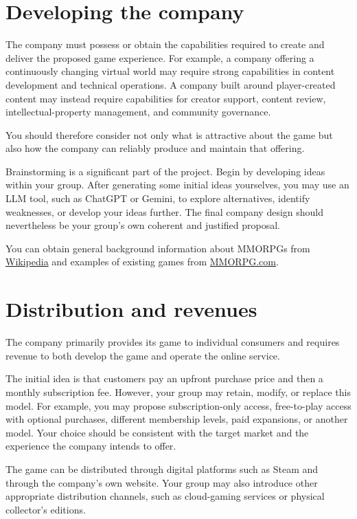 \documentclass[12pt,a4paper]{article}
\begin{document}
\section*{Developing the company}

The company must possess or obtain the capabilities required to create and deliver the proposed game experience. For example, a
company offering a continuously changing virtual world may require strong capabilities in content development and technical
operations. A company built around player-created content may instead require capabilities for creator support, content review,
intellectual-property management, and community governance.

You should therefore consider not only what is attractive about the game but also how the company can reliably produce and maintain
that offering.

Brainstorming is a significant part of the project. Begin by developing ideas within your group. After generating some initial ideas
yourselves, you may use an LLM tool, such as ChatGPT or Gemini, to explore alternatives, identify weaknesses, or develop your ideas
further. The final company design should nevertheless be your group's own coherent and justified proposal.

You can obtain general background information about MMORPGs from
\href{https://en.wikipedia.org/wiki/Massively_multiplayer_online_role-playing_game}{Wikipedia} and examples of existing games from
\href{https://www.mmorpg.com/}{MMORPG.com}.

\section*{Distribution and revenues}

The company primarily provides its game to individual consumers and requires revenue to both develop the game and operate the online
service.

The initial idea is that customers pay an upfront purchase price and then a monthly subscription fee. However, your group may retain,
modify, or replace this model. For example, you may propose subscription-only access, free-to-play access with optional purchases,
different membership levels, paid expansions, or another model. Your choice should be consistent with the target market and the
experience the company intends to offer.

The game can be distributed through digital platforms such as Steam and through the company's own website. Your group may also
introduce other appropriate distribution channels, such as cloud-gaming services or physical collector's editions.
\end{document}
